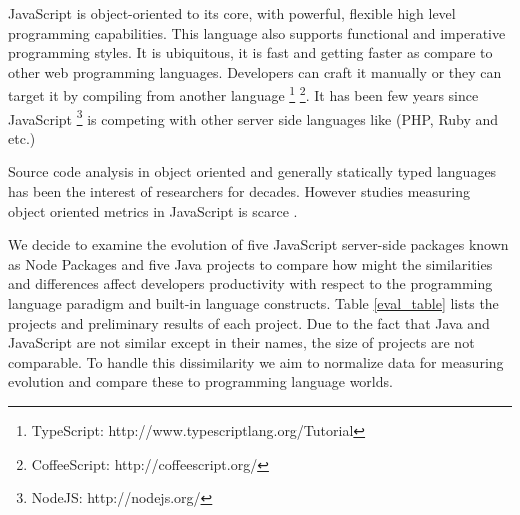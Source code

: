 JavaScript is object-oriented to its core, with powerful, flexible high level programming capabilities. This language also supports functional and imperative programming styles. It is ubiquitous, it is fast and getting faster as compare to other web programming languages. Developers can craft it manually or they can target it by compiling from another language \footnote{TypeScript: http://www.typescriptlang.org/Tutorial} \footnote{CoffeeScript: http://coffeescript.org/}. It has been few years since JavaScript \footnote{NodeJS: http://nodejs.org/} is competing with other server side languages like (PHP, Ruby and etc.)

Source code analysis in object oriented and generally statically typed languages has been the interest of researchers for decades. However studies measuring object oriented metrics in JavaScript is scarce \cite{Richards:2010:ADB:1809028.1806598} \cite{6320536}.

We decide to examine the evolution of five JavaScript server-side packages known as Node Packages and five Java projects to compare how might the similarities and differences affect developers productivity with respect to the programming language paradigm and built-in language constructs.  Table \ref{eval_table} lists the projects and preliminary results of each project. Due to the fact that Java and JavaScript are not similar except in their names, the size of projects are not comparable. To handle this dissimilarity we aim to normalize data for measuring evolution and compare these to programming language worlds.